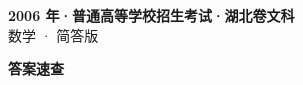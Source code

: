 \documentclass[zihao=-4, a4paper]{ctexart}
\begin{document}
\begin{center}
  {\Large\bfseries 2006 年·普通高等学校招生考试·湖北卷文科}\\[4pt]
  {\large 数学 · 简答版}
\end{center}
\medskip
{}

\clearpage
{}
\begin{center}{\Large\bfseries 答案速查}\end{center}
\medskip

\end{document}
